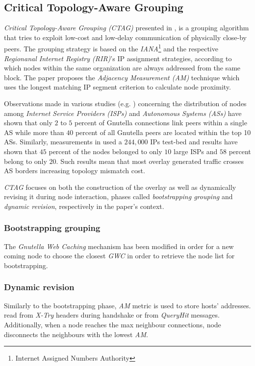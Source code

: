 \documentclass[a4paper,10pt]{article}
\begin{document}
\subsection{Critical Topology-Aware Grouping}
\emph{Critical Topology-Aware Grouping (CTAG)} presented in \cite{zhao_ctag_2006}, is a grouping algorithm that tries to exploit low-cost and low-delay communication of physically close-by peers. The grouping strategy is based on the \emph{IANA}\footnote{Internet Assigned Numbers Authority} and the respective \emph{Regionanal Internet Registry (RIR)}'s IP assignment strategies, according to which nodes within the same organization are always addressed from the same block. The paper proposes the \emph{Adjacency Measurement (AM)} technique which uses the longest matching IP segment criterion to calculate node proximity.

Observations made in various studies (e.g. \cite{matei_mapgnutella_2002}) concerning the distribution of nodes among \emph{Internet Service Providers (ISPs)} and \emph{Autonomous Systems (ASs)} have shown that only $2$ to $5$ percent of Gnutella connections link peers within a single AS while more than $40$ percent of all Gnutella peers are located within the top 10 ASs. Similarly, measurements in \cite{zeinalipour-yazti_gnudc_2002} used a $244,000$ IPs test-bed and results have shown that $45$ percent of the nodes belonged to only $10$ large ISPs and $58$ percent belong to only $20$. Such results mean that most overlay generated traffic crosses AS borders increasing topology mismatch cost.

\emph{CTAG} focuses on both the construction of the overlay as well as dynamically revising it during node interaction, phases called \emph{bootstrapping grouping} and \emph{dynamic revision}, respectively in the paper's context.

\subsubsection*{Bootstrapping grouping}
The \emph{Gnutella Web Caching} mechanism has been modified in order for a new coming node to choose the closest \emph{GWC} in order to retrieve the node list for bootstrapping.

\subsubsection*{Dynamic revision}
Similarly to the bootstrapping phase, \emph{AM} metric is used to store hosts' addresses. read from \emph{X-Try} headers during handshake or from \emph{QueryHit} messages. Additionally, when a node reaches the max neighbour connections, node disconnects the neighbours with the lowest \emph{AM}.
\end{document}
